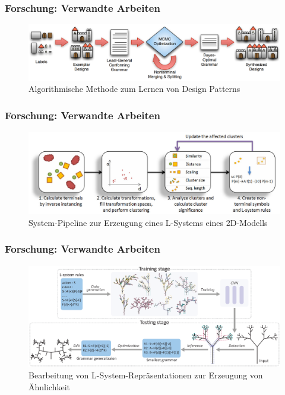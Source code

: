\documentclass[12pt]{beamer}
\begin{document}
    \begin{frame}
        \frametitle{Forschung: Verwandte Arbeiten}

        \begin{figure}
            \centering
            \includegraphics[width=12cm]{../images/talton_2012_system.PNG}
            \caption{Algorithmische Methode zum Lernen von Design Patterns}
        \end{figure}
    \end{frame}

    \begin{frame}
        \frametitle{Forschung: Verwandte Arbeiten}

        \begin{figure}
            \centering
            \includegraphics[width=12cm]{../images/stava_2010_system.PNG}
            \caption{System-Pipeline zur Erzeugung eines L-Systems eines 2D-Modells}
        \end{figure}
    \end{frame}

    \begin{frame}
        \frametitle{Forschung: Verwandte Arbeiten}

        \begin{figure}
            \centering
            \includegraphics[width=12cm]{../images/guo_2020_system.PNG}
            \caption{Bearbeitung von L-System-Repräsentationen zur Erzeugung von Ähnlichkeit}
        \end{figure}
    \end{frame}
\end{document}

